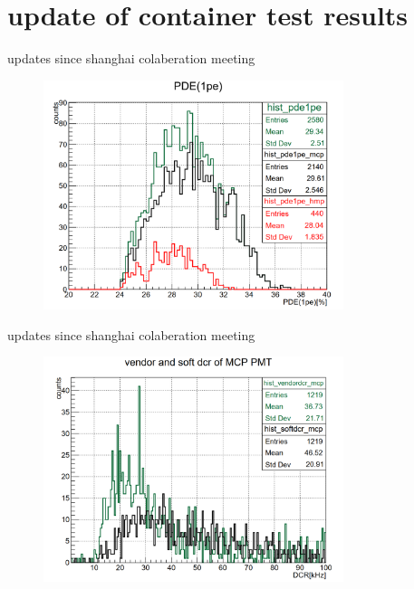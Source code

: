 %
\section{update of container test results}
\begin{frame}{updates since shanghai colaberation meeting}
\begin{figure}
\centering
\includegraphics[width=0.78\textwidth]{figures/zr01.png} %
\end{figure}
\end{frame}
\begin{frame}{updates since shanghai colaberation meeting}
\begin{figure}
\centering
\includegraphics[width=0.78\textwidth]{figures/zr02.png} %
\end{figure}
\end{frame}
